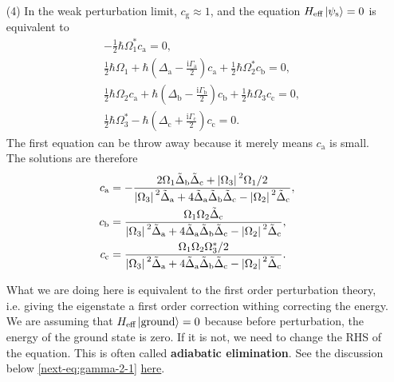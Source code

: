 \documentclass[hyperref, a4paper]{article}
\newcommand*{\ii}{\mathrm{i}}
\newcommand*{\concept}[1]{{\textbf{#1}}}
\begin{document}
\begin{itemize}
\item[(4)] In the weak perturbation limit, $c_\text{g} \approx 1$, and the equation 
$H_\text{eff} \ket*{\psi_\text{s}} = 0$ is equivalent to 
\[
    \begin{aligned}
        &- \frac{1}{2} \hbar \Omega_1^* c_\text{a} = 0, \\
        & \frac{1}{2} \hbar \Omega_1 + \hbar \left( \Delta_\text{a} - \frac{\ii \Gamma_\text{a}}{2}  \right) c_\text{a} + \frac{1}{2} \hbar \Omega_2^* c_\text{b} = 0, \\
        &\frac{1}{2} \hbar \Omega_2 c_\text{a} + \hbar \left( \Delta_\text{b} - \frac{\ii \Gamma_\text{b}}{2}  \right) c_\text{b} + \frac{1}{2} \hbar \Omega_3 c_\text{c} = 0, \\
        &\frac{1}{2} \hbar \Omega_3^* - \hbar \left( \Delta_\text{c} + \frac{\ii \Gamma_\text{c}}{2} \right) c_\text{c} = 0.
    \end{aligned}
\]
The first equation can be throw away because it merely means $c_\text{a}$ is small. The solutions are therefore 
\begin{equation}
    \begin{aligned}
        c_\text{a} &= - \frac{2 \Omega_1 \tilde{\Delta}_\text{b} \tilde{\Delta}_\text{c} +  \abs*{\Omega_3}^2 \Omega_1 / 2 }{ \abs*{\Omega_3}^2 \tilde{\Delta}_\text{a} + 4 \tilde{\Delta}_\text{a} \tilde{\Delta}_\text{b} \tilde{\Delta}_\text{c} - \abs*{\Omega_2}^2 \tilde{\Delta}_\text{c} }, \\
        c_\text{b} &= \frac{\Omega_1 \Omega_2 \tilde{\Delta}_\text{c}}{ \abs*{\Omega_3}^2 \tilde{\Delta}_\text{a} + 4 \tilde{\Delta}_\text{a} \tilde{\Delta}_\text{b} \tilde{\Delta}_\text{c} - \abs*{\Omega_2}^2 \tilde{\Delta}_\text{c} }, \\
        c_\text{c} &= \frac{\Omega_1 \Omega_2 \Omega_3^* / 2 }{ \abs*{\Omega_3}^2 \tilde{\Delta}_\text{a} + 4 \tilde{\Delta}_\text{a} \tilde{\Delta}_\text{b} \tilde{\Delta}_\text{c} - \abs*{\Omega_2}^2 \tilde{\Delta}_\text{c} }.
    \end{aligned}
    \label{eq:perturbation-results-2}
\end{equation}

\begin{note*}{}
    What we are doing here is equivalent to the first order perturbation theory, i.e. giving the eigenstate a 
    first order correction withing correcting the energy. We are assuming that $H_\text{eff} \ket*{\text{ground}} = 0$
    because before perturbation, the energy of the ground state is zero. If it is not, we need to change the 
    RHS of the equation. This is often called \concept{adiabatic elimination}. See the discussion below  
    \eqref{next-eq:gamma-2-1} \href{../5/5-discussion.pdf}{here}.
\end{note*}


\end{itemize}
\end{document}
